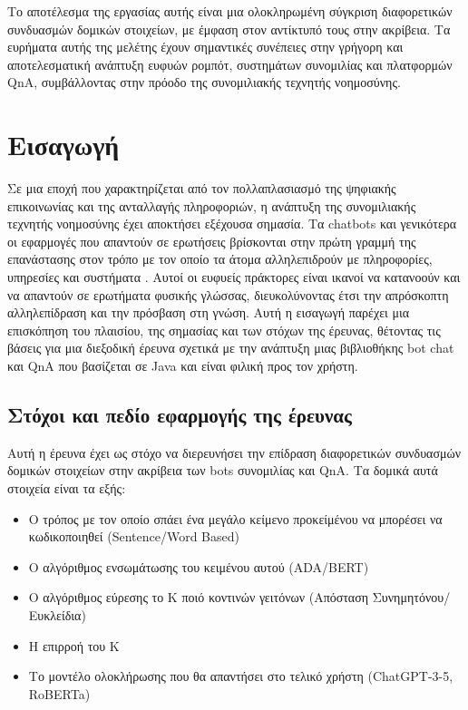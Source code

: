 \documentclass{report}
\begin{document}
Το αποτέλεσμα της εργασίας αυτής είναι μια ολοκληρωμένη σύγκριση διαφορετικών συνδυασμών δομικών στοιχείων, με έμφαση στον αντίκτυπό τους στην ακρίβεια. Τα ευρήματα αυτής της μελέτης έχουν σημαντικές συνέπειες στην γρήγορη και αποτελεσματική ανάπτυξη ευφυών ρομπότ, συστημάτων συνομιλίας και πλατφορμών QnA, συμβάλλοντας στην πρόοδο της συνομιλιακής τεχνητής νοημοσύνης.

\chapter{Εισαγωγή}

Σε μια εποχή που χαρακτηρίζεται από τον πολλαπλασιασμό της ψηφιακής επικοινωνίας και της ανταλλαγής πληροφοριών, η ανάπτυξη της συνομιλιακής τεχνητής νοημοσύνης έχει αποκτήσει εξέχουσα σημασία. Τα chatbots και γενικότερα οι εφαρμογές που απαντούν σε ερωτήσεις βρίσκονται στην πρώτη γραμμή της επανάστασης στον τρόπο με τον οποίο τα άτομα αλληλεπιδρούν με πληροφορίες, υπηρεσίες και συστήματα \cite{greek_ref}. Αυτοί οι ευφυείς πράκτορες είναι ικανοί να κατανοούν και να απαντούν σε ερωτήματα φυσικής γλώσσας, διευκολύνοντας έτσι την απρόσκοπτη αλληλεπίδραση και την πρόσβαση στη γνώση. Αυτή η εισαγωγή παρέχει μια επισκόπηση του πλαισίου, της σημασίας και των στόχων της έρευνας, θέτοντας τις βάσεις για μια διεξοδική έρευνα σχετικά με την ανάπτυξη μιας βιβλιοθήκης bot chat και QnA που βασίζεται σε Java και είναι φιλική προς τον χρήστη.

\section{Στόχοι και πεδίο εφαρμογής της έρευνας}

Αυτή η έρευνα έχει ως στόχο να διερευνήσει την επίδραση διαφορετικών συνδυασμών δομικών στοιχείων στην ακρίβεια των bots συνομιλίας και QnA. Τα δομικά αυτά στοιχεία είναι τα εξής:

\begin{itemize}
  \item Ο τρόπος με τον οποίο σπάει ένα μεγάλο κείμενο προκείμένου να μπορέσει να κωδικοποιηθεί (Sentence/Word Based)
  \item Ο αλγόριθμος ενσωμάτωσης του κειμένου αυτού (ADA/BERT)
  \item Ο αλγόριθμος εύρεσης το K ποιό κοντινών γειτόνων (Απόσταση Συνημητόνου/Ευκλείδια)
  \item Η επιρροή του Κ
  \item Το μοντέλο ολοκλήρωσης που θα απαντήσει στο τελικό χρήστη (ChatGPT-3-5, RoBERTa)
\end{itemize}
\end{document}
